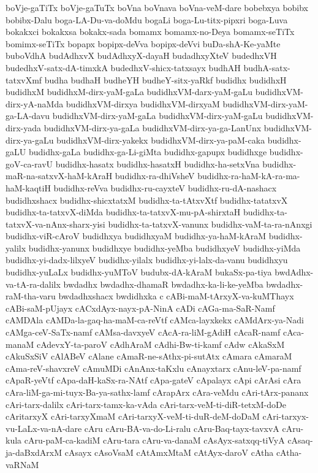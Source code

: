 {boVje-gaTiTx
boVje-gaTuTx
boVna
boVnava
boVna-veM-dare
bobebxya
bobibx
bobibx-Dalu
boga-LA-Du-va-doMdu
bogaLi
boga-Lu-titx-pipxri
boga-Luva
bokakxci
bokakxsa
bokakx-sada
bomamx
bomamx-no-Deya
bomamx-seTiTx
bomimx-seTiTx
bopapx
bopipx-deVva
bopipx-deVvi
buDa-shA-Ke-yaMte
buboVdhA
budAdhxvX
budAdhxyX-dayaH
budadhxyXteV
budedhxVH
budedhxV-satx-dA-timxkA
budedhxV-shicx-tatxsayx
budhAH
budhA-satx-tatxvXmf
budha
budhaH
budheYH
budheY-sitx-yaRkf
budidhx
budidhxH
budidhxM
budidhxM-dirx-yaM-gaLa
budidhxVM-darx-yaM-gaLu
budidhxVM-dirx-yA-naMda
budidhxVM-dirxya
budidhxVM-dirxyaM
budidhxVM-dirx-yaM-ga-LA-davu
budidhxVM-dirx-yaM-gaLa
budidhxVM-dirx-yaM-gaLu
budidhxVM-dirx-yada
budidhxVM-dirx-ya-gaLa
budidhxVM-dirx-ya-ga-LanUnx
budidhxVM-dirx-ya-gaLu
budidhxVM-dirx-yakekx
budidhxVM-dirx-ya-paM-caka
budidhx-gaLU
budidhx-gaLa
budidhx-ga-Li-giMta
budidhx-gapupx
budidhxge
budidhx-goV-ca-ravU
budidhx-hasatx
budidhx-hasatxH
budidhx-ha-setxVna
budidhx-maR-na-satxvX-haM-kAraH
budidhx-ra-dhiVsheV
budidhx-ra-haM-kA-ra-ma-haM-kaqtiH
budidhx-reVva
budidhx-ru-cayxteV
budidhx-ru-dA-nashacx
budidhxshacx
budidhx-shicxtatxM
budidhx-ta-tAtxvXtf
budidhx-tatatxvX
budidhx-ta-tatxvX-diMda
budidhx-ta-tatxvX-mu-pA-shirxtaH
budidhx-ta-tatxvX-va-nAnx-sharx-yisi
budidhx-ta-tatxvX-vanunx
budidhx-vaM-ta-ra-nAnxgi
budidhx-viR-cAroV
budidhxya
budidhxyaM
budidhx-ya-haM-kAraM
budidhx-yalilx
budidhx-yanunx
budidhxye
budidhx-yeMba
budidhxyeV
budidhx-yiMda
budidhx-yi-dadx-lilxyeV
budidhx-yilalx
budidhx-yi-lalx-da-vanu
budidhxyu
budidhx-yuLaLx
budidhx-yuMToV
budubx-dA-kAraM
bukaSx-pa-tiya
bwdAdhx-va-tA-ra-dalilx
bwdadhx
bwdadhx-dhamaR
bwdadhx-ka-li-ke-yeMba
bwdadhx-raM-tha-varu
bwdadhxshacx
bwdidhxka
c
cABi-maM-tArxyX-va-kuMThayx
cABi-saM-pUjayx
cACxdAyx-nayx-pA-NinA
cADi
cAGa-ma-SaR-Namf
cAMDAla
cAMDa-la-gaq-ha-maM-ca-reVtf
cAMca-layxkekx
cAMdArx-ya-Nadi
cAMga-ceV-SaTx-namf
cAMsa-davxyeV
cAcA-ra-liM-gAdiH
cAcaR-namf
cAca-manaM
cAdevxY-ta-paroV
cAdhAraM
cAdhi-Bw-ti-kamf
cAdw
cAkaSxM
cAkuSxSiV
cAlABeV
cAlane
cAmaR-ne-sAthx-pi-sutAtx
cAmara
cAmaraM
cAma-reV-shavxreV
cAmuMDi
cAnAnx-taKxlu
cAnayxtarx
cAnu-leV-pa-namf
cApaR-yeVtf
cApa-daH-kaSx-ra-NAtf
cApa-gateV
cApalayx
cApi
cArAsi
cAra
cAra-liM-ga-mi-tuyx-Ba-ya-sathx-lamf
cArapArx
cAra-veMdu
cAri-tArx-pananx
cAri-tarx-dalilx
cAri-tarx-tamx-ka-vAda
cAri-tarx-veM-ti-diR-tetxM-doDe
cAritarxyX
cAri-tarxyXmaM
cAri-tarxyX-veM-ti-duR-deM-doDaM
cAri-tarxyx-vu-LaLx-va-nA-dare
cAru
cAru-BA-va-do-Li-ralu
cAru-Baq-tayx-tavxvA
cAru-kula
cAru-paM-ca-kadiM
cAru-tara
cAru-va-danaM
cAsAyx-satxqq-tiVyA
cAsaq-ja-daBxdArxM
cAsayx
cAsoVsaM
cAtAmxMtaM
cAtAyx-daroV
cAtha
cAtha-vaRNaM
}
